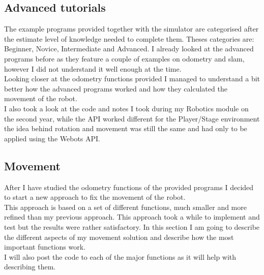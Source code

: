 \documentclass[10pt,a4paper]{article}
\begin{document}
\begin{flushleft}
\subsection{Advanced tutorials}
The example programs provided together with the simulator are categorised after the estimate level of knowledge needed to complete them. Theses categories are: Beginner, Novice, Intermediate and Advanced. I already looked at the advanced programs before as they feature a couple of examples on odometry and slam, however I did not understand it well enough at the time.\\
Looking closer at the odometry functions provided I managed to understand a bit better how the advanced programs worked and how they calculated the movement of the robot. \\[3ex]

I also took a look at the code and notes I took during my Robotics module on the second year, while the API worked different for the Player/Stage environment the idea behind rotation and movement was still the same and had only to be applied using the Webots API.

\subsection{Movement}
After I have studied the odometry functions of the provided programs I decided to start a new approach to fix the movement of the robot.\\
This approach is based on a set of different functions, much smaller and more refined than my previous approach. This approach took a while to implement and test but the results were rather satisfactory. In this section I am going to describe the different aspects of my movement solution and describe how the most important functions work.\\
I will also post the code to each of the major functions as it will help with describing them. 


\end{flushleft}
\end{document}
